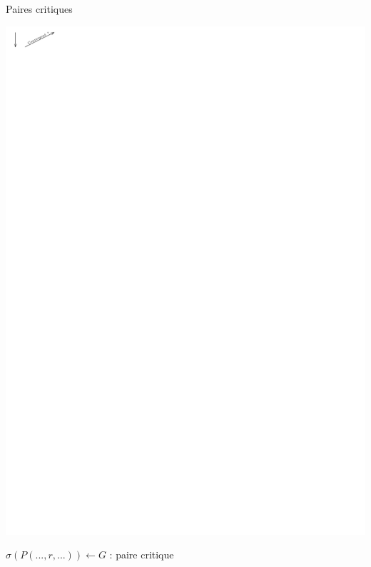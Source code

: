 \begin{frame}{Paires critiques}
\begin{overprint}
\begin{center}
      \includegraphics[width=.8\linewidth]{media/CP2.pdf} \\
    \end{center}
  \end{overprint}
  $\sigma(P(..., r, ...)) \leftarrow G$ : paire critique
\end{frame}


